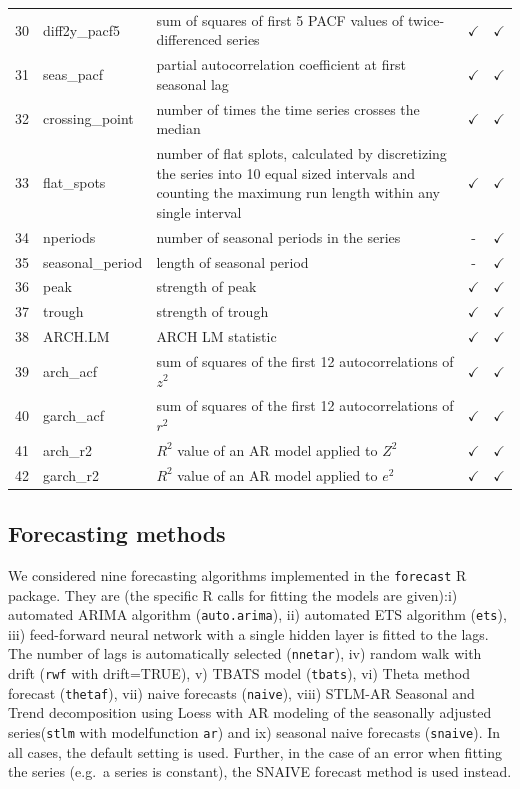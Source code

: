 \documentclass[11pt,a4paper,]{article}
\def\yes{$\checkmark$}
\theoremstyle{definition}
\theoremstyle{definition}
\theoremstyle{definition}
\theoremstyle{remark}
\begin{document}
\begin{table}[!htp]
\begin{tabular}{llp{}cc}
30 & diff2y\_pacf5  & sum of squares of first 5 PACF values of twice-differenced series                       & \yes  & \yes \\
31 & seas\_pacf  & partial autocorrelation coefficient at first seasonal lag                       & \yes  & \yes \\
32 & crossing\_point  & number of times the time series crosses the median                     & \yes  & \yes \\
33 & flat\_spots  & number of flat splots, calculated by discretizing the series into 10 equal sized intervals and counting the maximung run length within any single interval                       & \yes  & \yes \\
34 & nperiods  & number of seasonal periods in the series & -  & \yes \\
35 & seasonal\_period  & length of seasonal period                       & -  & \yes \\
36 & peak  & strength of peak                      & \yes  & \yes \\
37 & trough  & strength of trough                      & \yes  & \yes \\
38 & ARCH.LM  & ARCH LM statistic                      & \yes  & \yes \\
39 & arch\_acf  &    sum of squares of the first 12 autocorrelations of $z^2$               & \yes  & \yes \\
40 & garch\_acf  &  sum of squares of the first 12 autocorrelations of $r^2$                 & \yes  & \yes \\
41 & arch\_r2  &     $R^2$ value of an AR model applied to $Z^2$              & \yes  & \yes \\
42 & garch\_r2  &   $R^2$ value of an AR model applied to $e^2$                 & \yes  & \yes \\
\bottomrule
 \end{tabular}
\end{table}

\subsection{Forecasting methods}\label{forecasting-methods}

We considered nine forecasting algorithms implemented in the
\texttt{forecast} R package. They are (the specific R calls for fitting
the models are given):i) automated ARIMA algorithm
(\texttt{auto.arima}), ii) automated ETS algorithm (\texttt{ets}), iii)
feed-forward neural network with a single hidden layer is fitted to the
lags. The number of lags is automatically selected (\texttt{nnetar}),
iv) random walk with drift (\texttt{rwf} with drift=TRUE), v) TBATS
model (\texttt{tbats}), vi) Theta method forecast (\texttt{thetaf}),
vii) naive forecasts (\texttt{naive}), viii) STLM-AR Seasonal and Trend
decomposition using Loess with AR modeling of the seasonally adjusted
series(\texttt{stlm} with modelfunction \texttt{ar}) and ix) seasonal
naive forecasts (\texttt{snaive}). In all cases, the default setting is
used. Further, in the case of an error when fitting the series (e.g.~a
series is constant), the SNAIVE forecast method is used instead.
\end{document}
